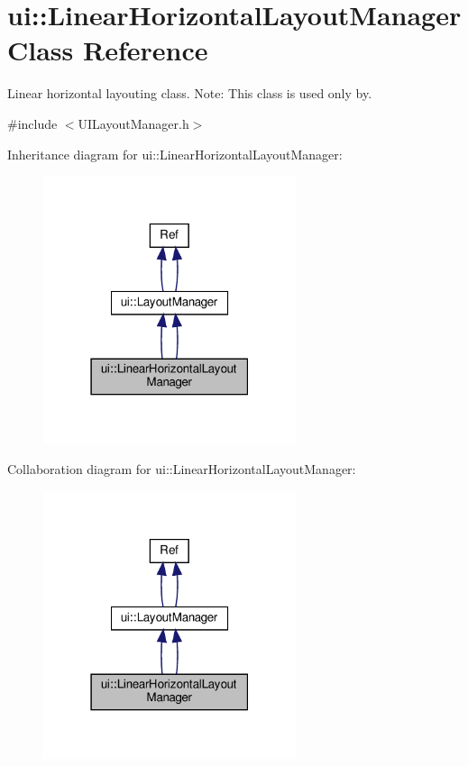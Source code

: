 \hypertarget{classui_1_1LinearHorizontalLayoutManager}{}\section{ui\+:\+:Linear\+Horizontal\+Layout\+Manager Class Reference}
\label{classui_1_1LinearHorizontalLayoutManager}


Linear horizontal layouting class. Note\+: This class is used only by.  




{\ttfamily \#include $<$U\+I\+Layout\+Manager.\+h$>$}



Inheritance diagram for ui\+:\+:Linear\+Horizontal\+Layout\+Manager\+:
\nopagebreak
\begin{figure}[H]
\begin{center}
\leavevmode
\includegraphics[width=210pt]{classui_1_1LinearHorizontalLayoutManager__inherit__graph}
\end{center}
\end{figure}


Collaboration diagram for ui\+:\+:Linear\+Horizontal\+Layout\+Manager\+:
\nopagebreak
\begin{figure}[H]
\begin{center}
\leavevmode
\includegraphics[width=210pt]{classui_1_1LinearHorizontalLayoutManager__coll__graph}
\end{center}
\end{figure}
